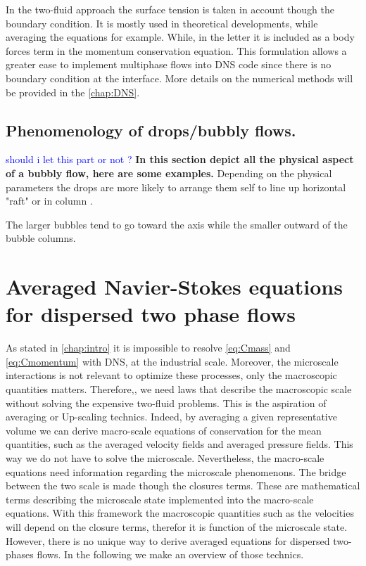 In the two-fluid approach the surface tension is taken in account though the boundary condition. 
It is mostly used in theoretical developments, while averaging the equations for example.
While, in the letter it is included as a body forces term in the momentum conservation equation. 
This formulation allows a greater ease to implement multiphase flows into DNS code since there is no boundary condition at the interface.
More details on the numerical methods will be provided in the \ref{chap:DNS}. 

\subsection{Phenomenology of drops/bubbly flows.}
\textcolor{blue}{should i let this part or not ?}
\textbf{In this section depict all the physical aspect of a bubbly flow, here are some examples.}
Depending on the physical parameters the drops are more likely to arrange them self to line up horizontal "raft" or in column \citep{tryggvason2011direct}\citep{guazzelli2011}. 

\citet{morel2010comparison} The larger bubbles tend to go toward the axis while the smaller outward of the bubble columns.


\section{Averaged Navier-Stokes equations for dispersed two phase flows}

As stated in \ref{chap:intro} it is impossible to resolve \ref{eq:Cmass} and \ref{eq:Cmomentum} with DNS, at the industrial scale. 
Moreover, the microscale interactions is not relevant to optimize these processes, only the macroscopic quantities matters. 
Therefore,, we need laws that describe the macroscopic scale without solving the expensive two-fluid problems. 
This is the aspiration of averaging or Up-scaling technics.
Indeed, by averaging a given representative volume we can derive macro-scale equations of conservation for the mean quantities, such as the averaged velocity fields and averaged pressure fields. 
This way we do not have to solve the microscale.
Nevertheless, the macro-scale equations need information regarding the microscale phenomenons.
The bridge between the two scale is made though the closures terms. 
These are mathematical terms describing the microscale state implemented into the macro-scale equations.
With this framework the macroscopic quantities such as the velocities will depend on the closure terms, therefor it is function of the microscale state.
However, there is no unique way to derive averaged equations for dispersed two-phases flows. 
In the following we make an overview of those technics. 

